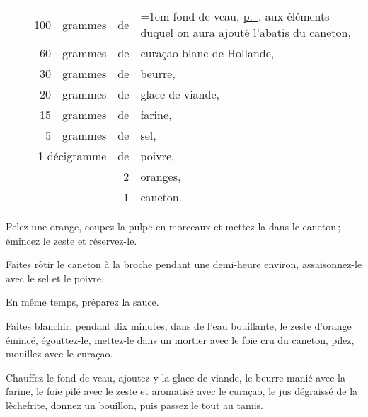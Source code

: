 \footnotesize
\begin{longtable}{rrrrrp{18em}}
  & \hspace{2em} & 100 & grammes & de & \hangindent=1em fond de veau, \hyperlink{p0426}{p. \pageref{pg0426}}, 
                                        aux éléments duquel on aura ajouté l'abatis du caneton,           \\
  & \hspace{2em} &  60 & grammes & de & curaçao blanc de Hollande,                                        \\
  & \hspace{2em} &  30 & grammes & de & beurre,                                                           \\
  & \hspace{2em} &  20 & grammes & de & glace de viande,                                                  \\
  & \hspace{2em} &  15 & grammes & de & farine,                                                           \\
  & \hspace{2em} &   5 & grammes & de & sel,                                                              \\
  & \multicolumn{3}{r}{1 décigramme} & de & poivre,                                                       \\
  & \hspace{2em} &     &         &  2 & oranges,                                                          \\
  & \hspace{2em} &     &         &  1 & caneton.                                                          \\
\end{longtable}
\normalsize

Pelez une orange, coupez la pulpe en morceaux et mettez-la dans le caneton ;
émincez le zeste et réservez-le.

Faites rôtir le caneton à la broche pendant une demi-heure environ,
assaisonnez-le avec le sel et le poivre.

En même temps, préparez la sauce.

Faites blanchir, pendant dix minutes, dans de l'eau bouillante, le zeste
d'orange émincé, égouttez-le, mettez-le dans un mortier avec le foie cru du
caneton, pilez, mouillez avec le curaçao.

Chauffez le fond de veau, ajoutez-y la glace de viande, le beurre manié avec la
farine, le foie pilé avec le zeste et aromatisé avec le curaçao, le jus
dégraissé de la lèchefrite, donnez un bouillon, puis passez le tout au tamis.

